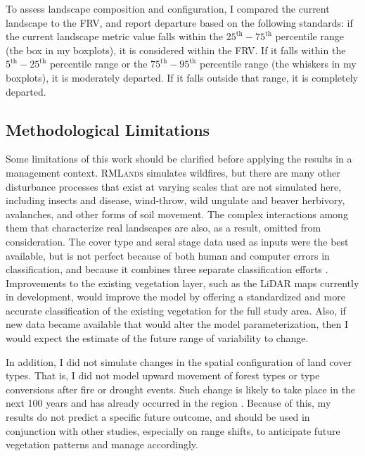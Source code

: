 To assess landscape composition and configuration, I compared the current landscape to the FRV, and report departure based on the following standards: if the current landscape metric value falls within the $25^{\text{th}}-75^{\text{th}}$ percentile range (the box in my boxplots), it is considered within the FRV. If it falls within the $5^{\text{th}}-25^{\text{th}}$ percentile range or the $75^{\text{th}}-95^{\text{th}}$ percentile range (the whiskers in my boxplots), it is moderately departed. If it falls outside that range, it is completely departed.



\subsection*{Methodological Limitations} %
Some limitations of this work should be clarified before applying the results in a management context. \textsc{RMLands} simulates wildfires, but there are many other disturbance processes that exist at varying scales that are not simulated here, including insects and disease, wind-throw, wild ungulate and beaver herbivory, avalanches, and other forms of soil movement. The complex interactions among them that characterize real landscapes are also, as a result, omitted from consideration. %
The cover type and seral stage data used as inputs were the best available, but is not perfect because of both human and computer errors in classification, and because it combines three separate classification efforts \citep{USDAForestService2009}. Improvements to the existing vegetation layer, such as the LiDAR maps currently in development, would improve the model by offering a standardized and more accurate classification of the existing vegetation for the full study area. Also, if new data became available that would alter the model parameterization, then I would expect the estimate of the future range of variability to change. 

In addition, I did not simulate changes in the spatial configuration of land cover types. That is, I did not model upward movement of forest types or type conversions after fire or drought events. Such change is likely to take place in the next 100 years and has already occurred in the region \citep{Bachelet2001}. Because of this, my results do not predict a specific future outcome, and should be used in conjunction with other studies, especially on range shifts, to anticipate future vegetation patterns and manage accordingly. 


